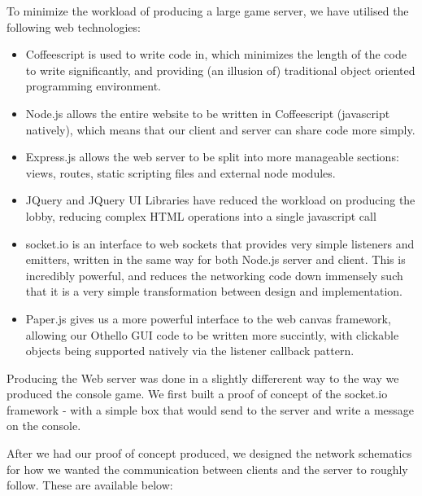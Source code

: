 \documentclass[a4wide, 11pt]{article}
\begin{document}
To minimize the workload of producing a large game server, we have utilised the following web technologies:
\begin{itemize}
\item Coffeescript is used to write code in, which minimizes the length of the code to write significantly, and providing (an illusion of) traditional object oriented programming environment.
\item Node.js allows the entire website to be written in Coffeescript (javascript natively), which means that our client and server can share code more simply.
\item Express.js allows the web server to be split into more manageable sections: views, routes, static scripting files and external node modules.
\item JQuery and JQuery UI Libraries have reduced the workload on producing the lobby, reducing complex HTML operations into  a single javascript call
\item socket.io is an interface to web sockets that provides very simple listeners and emitters, written in the same way for both Node.js server and client. This is incredibly powerful, and reduces the networking code down immensely such that it is a very simple transformation between design and implementation.
\item Paper.js gives us a more powerful interface to the web canvas framework, allowing our Othello GUI code to be written more succintly, with clickable objects being supported natively via the listener callback pattern.
\end{itemize}

Producing the Web server was done in a slightly differerent way to the way we produced the console game. We first built a proof of concept of the socket.io framework - with a simple box that would send to the server and write a message on the console. 

After we had our proof of concept produced, we designed the network schematics for how we wanted the communication between clients and the server to roughly follow. These are available below:
\end{document}
